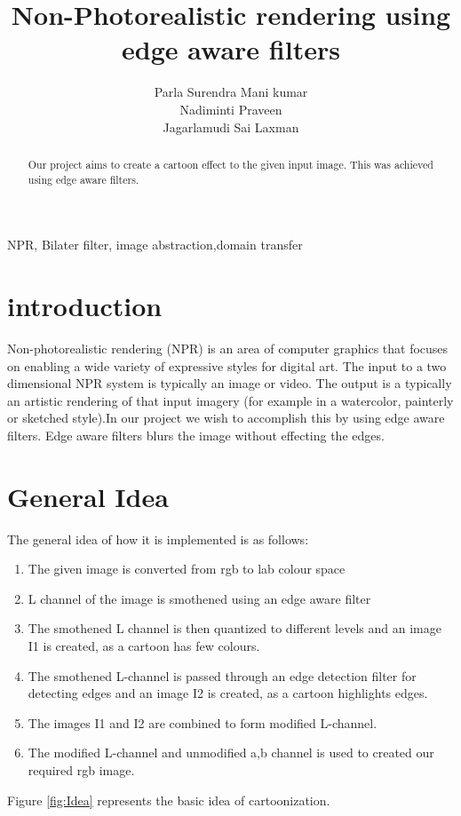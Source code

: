 \documentclass[conference]{IEEEtran}
\begin{document}
\title{Non-Photorealistic rendering using edge aware filters}
\author{Parla Surendra Mani kumar\\Nadiminti Praveen \\ Jagarlamudi Sai Laxman}
\maketitle

\begin{abstract}
	Our project aims to create a cartoon effect to the given input image. This was achieved using edge aware filters.	
\end{abstract}

\begin{IEEEkeywords}
	NPR, Bilater filter, image abstraction,domain transfer
\end{IEEEkeywords}

\section{introduction} \label{s1}
 Non-photorealistic rendering (NPR) is an area of computer graphics that focuses on enabling a wide variety of expressive styles for digital art. The input to a two dimensional NPR system is typically an image or video. The output is a typically an artistic rendering of that input imagery (for example in a watercolor, painterly or sketched style).In our project we wish to accomplish this by using edge aware filters. Edge aware filters blurs the image without effecting the edges. 
  
 \section{General Idea}
 The general idea of how it is implemented is as follows:
 \begin{enumerate}
 \item The given image is converted from rgb to lab colour space
 \item L channel of the image is smothened using an edge aware filter
 \item The smothened L channel is then quantized to different levels and an image I1 is created, as a cartoon has few colours.
 \item The smothened L-channel is passed through an edge detection filter for detecting edges and an image I2 is created, as a cartoon highlights edges.
 \item The images I1 and I2 are combined to form modified L-channel.
 \item The modified L-channel and unmodified a,b channel is used to created our required rgb image.
 \end{enumerate}
  Figure \ref{fig:Idea} represents the basic idea of cartoonization.
  
\end{document}
